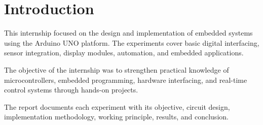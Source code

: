 \chapter{Introduction}

This internship focused on the design and implementation of embedded systems using the Arduino UNO platform. The experiments cover basic digital interfacing, sensor integration, display modules, automation, and embedded applications.

The objective of the internship was to strengthen practical knowledge of microcontrollers, embedded programming, hardware interfacing, and real-time control systems through hands-on projects.

The report documents each experiment with its objective, circuit design, implementation methodology, working principle, results, and conclusion.